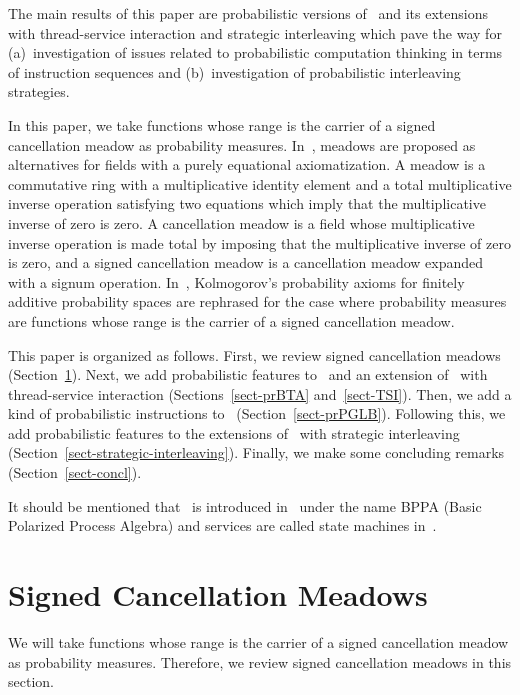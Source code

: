 \documentclass{llncs}
\begin{document}
The main results of this paper are probabilistic versions of \BTA\ and
its extensions with thread-service interaction and strategic 
interleaving which pave the way for  
(a)~investigation of issues related to probabilistic computation 
thinking in terms of instruction sequences and 
(b)~investigation of probabilistic interleaving strategies.

In this paper, we take functions whose range is the carrier of a signed 
cancellation meadow as probability measures.
In~\cite{BT07a}, meadows are proposed as alternatives for fields with a
purely equational axiomatization.
A meadow is a commutative ring with a multiplicative identity element
and a total multiplicative inverse operation satisfying two equations
which imply that the multiplicative inverse of zero is zero.
A cancellation meadow is a field whose multiplicative inverse operation 
is made total by imposing that the multiplicative inverse of zero is 
zero, and a signed cancellation meadow is a cancellation meadow expanded 
with a signum operation.
In~\cite{BP13a}, Kolmogorov's probability axioms for finitely additive 
probability spaces are rephrased for the case where probability measures 
are functions whose range is the carrier of a signed cancellation 
meadow.

This paper is organized as follows.
First, we review signed cancellation meadows 
(Section~\ref{sect-meadows}). 
Next, we add probabilistic features to \BTA\ and an extension of \BTA\ 
with thread-service interaction (Sections~\ref{sect-prBTA}
and~\ref{sect-TSI}).
Then, we add a kind of probabilistic instructions to \PGLB\
(Section~\ref{sect-prPGLB}).
Following this, we add probabilistic features to the extensions of \BTA\ 
with strategic interleaving 
(Section~\ref{sect-strategic-interleaving}).
Finally, we make some concluding remarks (Section~\ref{sect-concl}).

It should be mentioned that \BTA\ is introduced in~\cite{BL02a} under 
the name BPPA (Basic Polarized Process Algebra) and services are called
state machines in~\cite{BP02a}.

\section{Signed Cancellation Meadows}
\label{sect-meadows}

We will take functions whose range is the carrier of a signed 
cancellation meadow as probability measures.
Therefore, we review signed cancellation meadows in this section.
\end{document}
